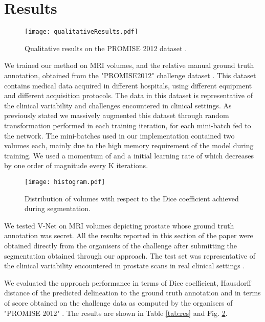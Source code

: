 \documentclass{llncs}
\begin{document}
\section{Results}
\label{sec:results}

\begin{figure} 	
\centering 	
\texttt{[image: qualitativeResults.pdf]} 	
\caption{Qualitative results on the PROMISE 2012 dataset \cite{litjens2014evaluation}.} \label{fig:qualitative} 
\end{figure}

We trained our method on  MRI volumes, and the relative manual ground truth annotation, obtained from the "PROMISE2012" challenge dataset \cite{litjens2014evaluation}. This dataset contains medical data acquired in different hospitals, using different equipment and different acquisition protocols. The data in this dataset is representative of the clinical variability and challenges encountered in clinical settings. As previously stated we massively augmented this dataset through random transformation performed in each training iteration, for each mini-batch fed to the network. The mini-batches used in our implementation contained two volumes each, mainly due to the high memory requirement of the model during training. We used a momentum of  and a initial learning rate of  which decreases by one order of magnitude every K iterations. 

\begin{figure} 	
\centering 	
\texttt{[image: histogram.pdf]} 	
\caption{Distribution of volumes with respect to the Dice coefficient achieved during segmentation.} 
\label{fig:hist} 
\end{figure}

We tested V-Net on  MRI volumes depicting prostate whose ground truth annotation was secret. All the results reported in this section of the paper were obtained directly from the organisers of the challenge after submitting the segmentation obtained through our approach. The test set was representative of the clinical variability encountered in prostate scans in real clinical settings \cite{litjens2014evaluation}. 

We evaluated the approach performance in terms of Dice coefficient, Hausdorff distance of the predicted delineation to the ground truth annotation and in terms of score obtained on the challenge data as computed by the organisers of "PROMISE 2012" \cite{litjens2014evaluation}. The results are shown in Table \ref{tab:res} and Fig. \ref{fig:hist}.
\end{document}
